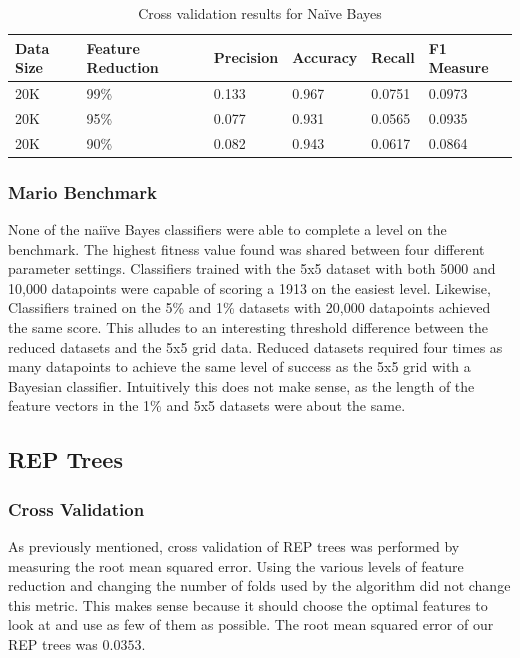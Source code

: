 \documentclass[]{article}   %
\begin{document}
\begin{table}[h!]
	\begin{center}
		\caption{Cross validation results for Na\"{i}ve Bayes}
		\begin{tabular}{l | l || l | l | l | l }
		\hline
		Data Size & Feature Reduction & Precision & Accuracy & Recall & F1 Measure \\
		\hline
		20K & 99\% & 0.133 & 0.967 & 0.0751 & 0.0973 \\
		20K & 95\% & 0.077 & 0.931 & 0.0565 & 0.0935 \\
		20K & 90\% & 0.082 & 0.943 & 0.0617 & 0.0864 \\
		\hline
		\end{tabular}
	\end{center}
\end{table}

\subsubsection{Mario Benchmark}
None of the nai\"{i}ve Bayes classifiers were able to complete a level on the benchmark. The highest fitness
value found was shared between four different parameter settings. Classifiers trained with the 5x5 dataset with both 5000 and 10,000
datapoints were capable of scoring a 1913 on the easiest level. Likewise, Classifiers trained on the 5\% and 1\% datasets with 20,000
datapoints achieved the same score.
\newline\newline
This alludes to an interesting threshold difference between the reduced datasets and the 5x5 grid data. Reduced datasets required four
times as many datapoints to achieve the same level of success as the 5x5 grid with a Bayesian classifier. Intuitively this does not make sense,
as the length of the feature vectors in the 1\% and 5x5 datasets were about the same. 

\subsection{REP Trees}
\subsubsection{Cross Validation}
As previously mentioned, cross validation of REP trees was performed by measuring the root mean squared error. Using the various levels of feature
reduction and changing the number of folds used by the algorithm did not change this metric. This makes sense because it should choose the optimal
features to look at and use as few of them as possible. The root mean squared error of our REP trees was $0.0353$.
\end{document}
